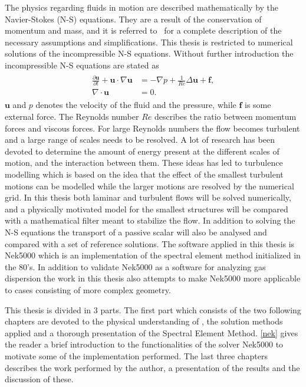 The physics regarding fluids in motion are described mathematically by the Navier-Stokes (N-S) equations. 
They are a result of the conservation of momentum and mass, and it is referred to~\cite{White} for a complete 
description of the necessary assumptions and simplifications. 
This thesis is restricted to numerical solutions of the incompressible N-S equations.
Without further introduction the incompressible N-S equations are stated as  
%
\begin{align}
    \begin{split}
    \frac{\partial \mathbf{u}}{\partial t} + \mathbf{u}\cdot \nabla\mathbf{u} &= 
    -\nabla p + \frac{1}{Re} \Delta\mathbf{u} + \mathbf{f}, \\
		\nabla \cdot \mathbf{u} &= 0.
    \end{split}
	\label{eq:NS}
\end{align}
%
$\mathbf{u}$ and $p$ denotes the velocity of the fluid and the pressure, while $\mathbf{f}$ is some external force. 
The Reynolds number $Re$ describes the ratio between momentum forces and viscous forces.
For large Reynolds numbers the flow becomes turbulent and a large range of scales needs to be resolved. A lot 
of research has been devoted to determine the amount of energy present at the different scales of motion, and 
the interaction between them. These ideas has led to turbulence modelling which is based on the 
idea that the effect of the smallest turbulent motions can be modelled while the larger motions are resolved by 
the numerical grid. 
In this thesis both laminar and turbulent flows will be solved numerically, 
and a physically motivated model for the smallest structures will be compared
with a mathematical filter meant to stabilize the flow.
In addition to solving the N-S equations the 
transport of a passive scalar will also be analysed and compared with a set of reference solutions. 
The software applied in this thesis is Nek5000 which is an implementation of the spectral element method initialized in the 80's.
In addition to validate Nek5000 as a software for analyzing gas dispersion the work in this thesis 
also attempts to make Nek5000 more applicable to cases consisting of more complex geometry. 

This thesis is divided in 3 parts. The first part which consists of the two following chapters are devoted to the physical understanding 
of , the solution methods applied and a thorough presentation of the Spectral Element Method. \cref{nek} gives the reader a brief 
introduction to the functionalities of the solver Nek5000 to motivate some of the implementation performed. The last three chapters 
describes the work performed by the author, a presentation of the results and the discussion of these.


